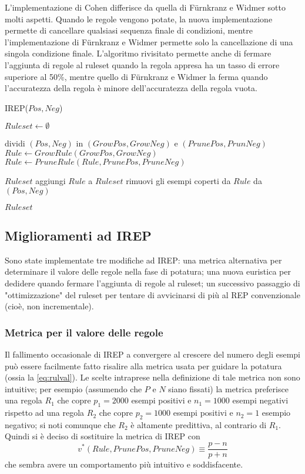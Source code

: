 L'implementazione di Cohen differisce da quella di Fürnkranz e Widmer sotto molti aspetti. Quando le regole vengono potate, la nuova implementazione permette di cancellare qualsiasi sequenza finale di condizioni, mentre l'implementazione di Fürnkranz e Widmer permette solo la cancellazione di una singola condizione finale. L'algoritmo rivisitato permette anche di fermare l'aggiunta di regole al ruleset quando la regola appresa ha un tasso di errore superiore al 50\%, mentre quello di Fürnkranz e Widmer la ferma quando l'accuratezza della regola è minore 
dell'accuratezza della regola vuota.

\begin{algorithm}[!htbp]
	\caption{IREP($Pos, Neg$)}
	\label{alg:irep}
	\begin{algorithmic}[1]
		\State $Ruleset \gets \emptyset$
		
		\State dividi $(Pos, Neg)$ in $(GrowPos, GrowNeg)$ e $(PrunePos, PrunNeg)$
		\State $Rule \gets GrowRule(GrowPos, GrowNeg)$
		\State $Rule \gets PruneRule(Rule, PrunePos, PruneNeg)$
		
		\State \Return $Ruleset$
		\Else
		\State aggiungi $Rule$ a $Ruleset$
		\State rimuovi gli esempi coperti da $Rule$ da $(Pos, Neg)$
		\EndIf
		\EndWhile
		
		\State \Return $Ruleset$
	\end{algorithmic}
\end{algorithm}

\pagebreak

\subsection*{Miglioramenti ad IREP}
Sono state implementate tre modifiche ad IREP: una metrica alternativa per determinare il valore delle regole nella fase di potatura; una nuova euristica per dedidere quando fermare l'aggiunta di regole al ruleset; un successivo passaggio di "ottimizzazione" del ruleset per tentare di avvicinarsi di più al REP convenzionale (cioè, non incrementale).

\subsubsection*{Metrica per il valore delle regole}
Il fallimento occasionale di IREP a convergere al crescere del numero degli esempi può essere facilmente fatto risalire alla metrica usata per guidare la potatura (ossia la \eqref{eq:rulval}). Le scelte intraprese nella definizione di tale metrica non sono intuitive; per esempio (assumendo che $P$ e $N$ siano fissati) la metrica preferisce una regola $R_1$ che copre $p_1 = 2000$ esempi positivi e $n_1 = 1000$ esempi negativi rispetto ad una regola $R_2$ che copre $p_2 = 1000$ esempi positivi e $n_2 = 1$ esempio negativo; si noti comunque che $R_2$ è altamente predittiva, al contrario di $R_1$. Quindi si è deciso di sostituire la metrica di IREP con $$v^*(Rule, PrunePos, PruneNeg) \equiv \frac{p - n}{p + n}$$ che sembra avere un comportamento più intuitivo e soddisfacente.

